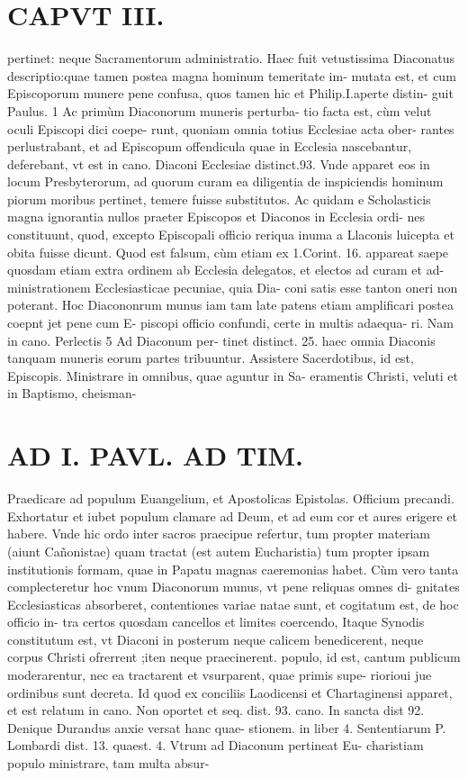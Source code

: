\documentclass{article}
\begin{document}
\begin{pages}
\section*{CAPVT  III. }
\marginpar{[ p.163 ]}\pstart pertinet: neque Sacramentorum administratio. Haec fuit vetustissima Diaconatus descriptio:quae tamen postea magna hominum temeritate im- mutata est, et cum Episcoporum munere pene confusa, quos tamen hic et Philip.I.aperte distin- guit Paulus. 1  \pend\pstart Ac primùm Diaconorum muneris perturba- tio facta est, cùm velut oculi Episcopi dici coepe- runt, quoniam omnia totius Ecclesiae acta ober- rantes perlustrabant, et ad Episcopum offendicula quae in Ecclesia nascebantur, deferebant, vt est in cano. Diaconi Ecclesiae distinct.93. Vnde apparet eos in locum Presbyterorum, ad quorum curam ea diligentia de inspiciendis hominum piorum moribus pertinet, temere fuisse substitutos. Ac quidam e Scholasticis magna ignorantia nullos praeter Episcopos et Diaconos in Ecclesia ordi- nes constituunt, quod, excepto Episcopali officio reriqua inuma a Llaconis luicepta et obita fuisse dicunt. Quod est falsum, cùm etiam ex 1.Corint. 16. appareat saepe quosdam etiam extra ordinem ab Ecclesia delegatos, et electos ad curam et ad- ministrationem Ecclesiasticae pecuniae, quia Dia- coni satis esse tanton oneri non poterant.  \pend\pstart Hoc Diacononrum munus iam tam late patens etiam amplificari postea coepnt jet pene cum E- piscopi officio confundi, certe in multis adaequa- ri. Nam in cano. Perlectis 5 Ad Diaconum per- tinet distinct. 25. haec omnia Diaconis tanquam muneris eorum partes tribuuntur.  \pend{} Assistere Sacerdotibus, id est, Episcopis.  \pend{} Ministrare in omnibus, quae aguntur in Sa- eramentis Christi, veluti et in Baptismo, cheisman-  \pend
\section*{AD I. PAVL. AD TIM. }
\marginpar{[ p.164 ]} Praedicare ad populum Euangelium, et Apostolicas Epistolas.  \pend\pstart Officium precandi.  \pend{} Exhortatur et iubet populum clamare ad Deum, et ad eum cor et aures erigere et habere.  \pend\pstart Vnde hic ordo inter sacros praecipue refertur, tum propter materiam (aiunt Cañonistae) quam tractat (est autem Eucharistia) tum propter ipsam institutionis formam, quae in Papatu magnas caeremonias habet.  \pend\pstart Cùm vero tanta complecteretur hoc vnum Diaconorum munus, vt pene reliquas omnes di- gnitates Ecclesiasticas absorberet, contentiones variae natae sunt, et cogitatum est, de hoc officio in- tra certos quosdam cancellos et limites coercendo, Itaque Synodis constitutum est, vt Diaconi in posterum neque calicem benedicerent, neque corpus Christi ofrerrent ;iten neque praecinerent. populo, id est, cantum publicum moderarentur, nec ea tractarent et vsurparent, quae primis supe- riorioui jue ordinibus sunt decreta. Id quod ex conciliis Laodicensi et Chartaginensi apparet, et est relatum in cano. Non oportet et seq. dist. 93. cano. In sancta dist 92.  \pend\pstart Denique Durandus anxie versat hanc quae- stionem. in liber 4. Sententiarum P. Lombardi dist. 13. quaest. 4. Vtrum ad Diaconum pertineat Eu- charistiam populo ministrare, tam multa absur-  \pend

\end{pages}
\end{document}
